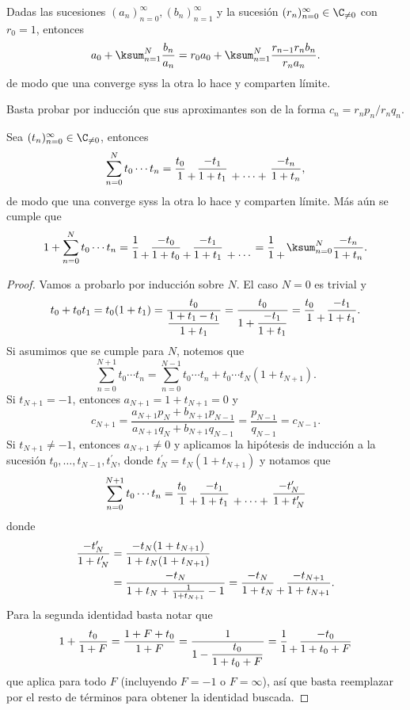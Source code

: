 \documentclass[teoria-numeros.tex]{subfiles}
\begin{document}
\begin{thm}
	Dadas las sucesiones $(a_n)_{n=0}^\infty, (b_n)_{n=1}^\infty$ y la sucesión $(r_n)_{n=0}^\infty \in \C_{\ne 0}$ con $r_0 = 1$, entonces
	$$ a_0 + \ksum_{n=1}^N \frac{b_n}{a_n} = r_0a_0 + \ksum_{n=1}^N \frac{r_{n-1}r_n b_n}{r_na_n}. $$
	de modo que una converge syss la otra lo hace y comparten límite.
\end{thm}
\begin{hint}
	Basta probar por inducción que sus aproximantes son de la forma $c_n = r_np_n / r_nq_n$.
\end{hint}

\begin{thmi}
	Sea $(t_n)_{n=0}^\infty \in \C_{\ne 0}$, entonces
	$$ \sum_{n=0}^N t_0\cdots t_n = \frac{t_0}{1} {\atop +} \frac{-t_1}{1 + t_1} {\atop {}+\cdots+{}} \frac{-t_n}{1 + t_n}, $$
	de modo que una converge syss la otra lo hace y comparten límite.
	Más aún se cumple que
	$$ 1 + \sum_{n=0}^N t_0\cdots t_n = \frac{1}{1} {\atop +} \frac{-t_0}{1 + t_0} {\atop +} \frac{-t_1}{1 + t_1} {\atop {}+\cdots}
	= \frac{1}{1} {\atop +} \ksum_{n=0}^N \frac{-t_n}{1 + t_n}. $$
\end{thmi}
\begin{proof}
	Vamos a probarlo por inducción sobre $N$.
	El caso $N = 0$ es trivial y
	$$ t_0 + t_0t_1 = t_0(1 + t_1) = \frac{t_0}{ \dfrac{1 + t_1 - t_1}{1 + t_1} } = \frac{t_0}{1 + \dfrac{-t_1}{1 + t_1}}
	= \frac{t_0}{1} {\atop +} \frac{-t_1}{1 + t_1}. $$
	Si asumimos que se cumple para $N$, notemos que
	$$ \sum_{n=0}^{N+1} t_0\cdots t_n = \sum_{n=0}^{N-1} t_0\cdots t_n + t_0\cdots t_N(1 + t_{N+1}). $$
	Si $t_{N+1} = -1$, entonces $a_{N+1} = 1 + t_{N+1} = 0$ y
	$$ c_{N+1} = \frac{a_{N+1}p_N + b_{N+1}p_{N-1}}{a_{N+1}q_N + b_{N+1}q_{N-1}} = \frac{p_{N-1}}{q_{N-1}} = c_{N-1}. $$
	Si $t_{N+1} \ne -1$, entonces $a_{N+1} \ne 0$ y aplicamos la hipótesis de inducción a la sucesión $t_0, \dots, t_{N-1}, t^\prime_N$, donde
	$t^\prime_N = t_N(1 + t_{N+1})$ y notamos que
	$$ \sum_{n=0}^{N+1} t_0\cdots t_n = \frac{t_0}{1} {\atop +} \frac{-t_1}{1 + t_1} {\atop {}+\cdots+{}} \frac{-t^\prime_N}{1 + t^\prime_N} $$
	donde
	\begin{align*}
		\frac{-t^\prime_N}{1 + t^\prime_N} &= \frac{-t_N(1 + t_{N+1})}{1 + t_N(1 + t_{N+1})} \\
						   &= \frac{-t_N}{1 + t_N + \frac{1}{1 + t_{N+1}} - 1} = \frac{-t_N}{1 + t_N} {\atop +} \frac{-t_{N+1}}{1 + t_{N+1}}.
	\end{align*}
	Para la segunda identidad basta notar que
	$$ 1 + \frac{t_0}{1 + F} = \frac{1 + F + t_0}{1 + F} = \frac{1}{1 - \dfrac{t_0}{1 + t_0 + F}} = \frac{1}{1} {\atop +} \frac{-t_0}{1 + t_0 + F} $$
	que aplica para todo $F$ (incluyendo $F = -1$ o $F = \infty$), así que basta reemplazar por el resto de términos para obtener la identidad buscada.
\end{proof}
\end{document}
